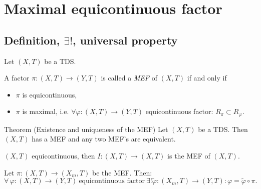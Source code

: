 \section{Maximal equicontinuous factor}
\subsection{Definition, $\exists!$, universal property}
\begin{frame}
  Let $(X,T)$ be a TDS.
  \begin{definition}
    A factor $\pi : (X,T) \to (Y,T)$ is called a \emph{MEF} of $(X,T)$ if and only if
  \begin{itemize}
    \item $\pi$ is equicontinuous,
    \item $\pi$ is maximal, i.e. $\forall \varphi : (X,T) \to (Y,T)$ equicontinuous factor: $R_\pi \subset R_\varphi$.
  \end{itemize}
\end{definition}
\pause
  \begin{alertblock}{Theorem (Existence and uniqueness of the MEF)}
  Let $(X,T)$ be a TDS.
  Then $(X,T)$ has a MEF and any two MEF's are equivalent.
  \end{alertblock}
  \pause
\begin{example}
  $(X,T)$ equicontinuous, then $I: (X,T) \to (X,T)$ is the MEF of $(X,T)$.
\end{example}

\end{frame}
\begin{frame}[fragile]
\begin{proposition}
  Let $\pi : (X, T) \to  (X_m,T)$ be the MEF.
  Then:
  \begin{equation*}
    \forall \, \varphi : (X,T) \to (Y,T) \ \text{equicontinuous factor} \ \exists!\tilde{\varphi}: (X_m,T) \to (Y,T): \varphi = \tilde{\varphi} \circ \pi.
  \end{equation*}
  \end{proposition}
  \begin{center}
  \end{center}
\end{frame}
